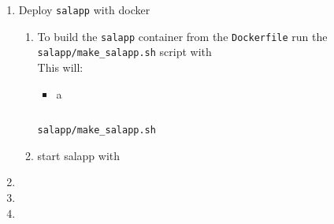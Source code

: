 \begin{enumerate}[leftmargin=0em,label=\protect\listlabelcircle{\arabic*}]
\begin{enumerate}[label=\roman*\textasciitilde]
        This script will  a docker container:
        \begin{itemize}
          \item {} -- named \texttt{mysql}
          \item {} -- detached so that it runs in the background
          \item {} -- with environment variables to configure a random root password, create a database for the web application, and create a user with a password for the web application
          \item from the \texttt{mysql/mysql-server:latest}\footnote{\href{https://hub.docker.com/\_/mysql}{Docker Hub: MySQL}} image on Docker Hub\footnote{\href{https://docs.docker.com/docker-hub/repos/}{Docker Docs: Docker Hub Repositories}}
        \end{itemize}
        \begin{listing}[H]
          \inputminted[fontsize=\small,breakanywhere]{bash}{../uswacs-2-iy2d502-salapp/start_mysql.sh}
          \caption{\texttt{salapp/start\_mysql.sh}}
          \label{lst:meth:start_mysql_sh}
        \end{listing}
    \end{enumerate}
  \item Deploy \texttt{salapp} with docker
    \begin{enumerate}[label=\roman*\textasciitilde~]
      \item To build the \texttt{salapp} container from the \texttt{Dockerfile} run the \texttt{salapp/make\_salapp.sh} script with \\
        This will:
        \begin{itemize}
          \item a
        \end{itemize}
        \begin{listing}[H]
          \inputminted[fontsize=\small,breakanywhere]{bash}{../uswacs-2-iy2d502-salapp/make_salapp.sh}
          \caption{\texttt{salapp/make\_salapp.sh}}
          \label{lst:meth:make_salapp_sh}
        \end{listing}
      \item start salapp with  
    \end{enumerate}
  \item {}
  \item {}
  \item {}
\end{enumerate}
